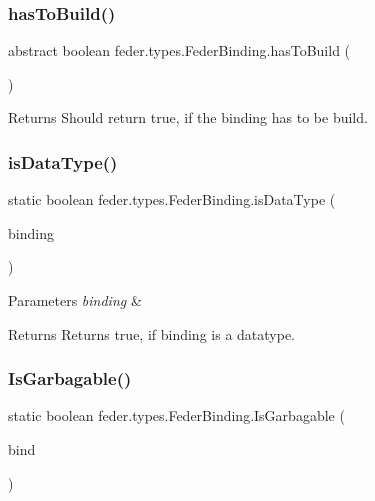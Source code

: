 \subsubsection{\texorpdfstring{has\+To\+Build()}{hasToBuild()}}
{\footnotesize\ttfamily abstract boolean feder.\+types.\+Feder\+Binding.\+has\+To\+Build (\begin{DoxyParamCaption}{ }\end{DoxyParamCaption})\hspace{0.3cm}{\ttfamily [abstract]}}

\begin{DoxyReturn}{Returns}
Should return true, if the binding has to be build. 
\end{DoxyReturn}
\mbox{\label{classfeder_1_1types_1_1FederBinding_a2c04e0db9889dacd7ad0c5a839797c2f}} 
\subsubsection{\texorpdfstring{is\+Data\+Type()}{isDataType()}}
{\footnotesize\ttfamily static boolean feder.\+types.\+Feder\+Binding.\+is\+Data\+Type (\begin{DoxyParamCaption}\item[{\hyperlink{classfeder_1_1types_1_1FederBinding}{Feder\+Binding}}]{binding }\end{DoxyParamCaption})\hspace{0.3cm}{\ttfamily [static]}}


\begin{DoxyParams}{Parameters}
{\em binding} & \\
\hline
\end{DoxyParams}
\begin{DoxyReturn}{Returns}
Returns true, if binding is a datatype. 
\end{DoxyReturn}
\mbox{\label{classfeder_1_1types_1_1FederBinding_a25f8e1f9d64b08dc98c7be9bf931e479}} 
\subsubsection{\texorpdfstring{Is\+Garbagable()}{IsGarbagable()}}
{\footnotesize\ttfamily static boolean feder.\+types.\+Feder\+Binding.\+Is\+Garbagable (\begin{DoxyParamCaption}\item[{\hyperlink{classfeder_1_1types_1_1FederBinding}{Feder\+Binding}}]{bind }\end{DoxyParamCaption})\hspace{0.3cm}{\ttfamily [static]}}


